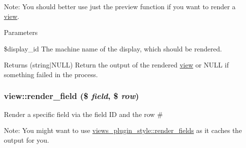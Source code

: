Note: You should better use just the preview function if you want to render a \hyperlink{classview}{view}.


\begin{DoxyParams}{Parameters}
\item[{\em string}]\$display\_\-id The machine name of the display, which should be rendered.\end{DoxyParams}
\begin{DoxyReturn}{Returns}
(string$|$NULL) Return the output of the rendered \hyperlink{classview}{view} or NULL if something failed in the process. 
\end{DoxyReturn}
\hypertarget{classview_a6b91f886cd5ab16151c7ea2e0ba95ad2}{
\subsubsection[{render\_\-field}]{\setlength{\rightskip}{0pt plus 5cm}view::render\_\-field (\$ {\em field}, \/  \$ {\em row})}}
\label{classview_a6b91f886cd5ab16151c7ea2e0ba95ad2}
Render a specific field via the field ID and the row \#

Note: You might want to use \hyperlink{classviews__plugin__style_a95d504017017c611b482a920119452db}{views\_\-plugin\_\-style::render\_\-fields} as it caches the output for you.


